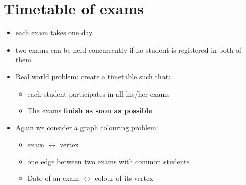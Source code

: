 \documentclass{article}[18pt]
\begin{document}
\section{Timetable of exams}
\begin{itemize}
\item each exam takes one day
\item two exams can be held concurrently if no student is registered in both of them
\item Real world problem: create a timetable such that:
\begin{itemize}
\item each student participates in all his/her exams
\item The exams \textbf{finish as soon as possible}
\end{itemize}
\item Again we consider a graph colouring problem:
\begin{itemize}
\item exam $\leftrightarrow$ vertex
\item one edge between two exams with common students
\item Date of an exam $\leftrightarrow$ colour of its vertex
\end{itemize}
\end{itemize}
\end{document}
